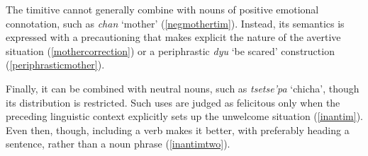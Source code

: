 \documentclass[output=paper,colorlinks,citecolor=brown]{langscibook}
\begin{document}
    \z
\z  

The timitive cannot generally combine with nouns of positive emotional connotation, such as \emph{chan} `mother' (\ref{negmothertim}). Instead, its semantics is expressed with a precautioning  that makes explicit the nature of the avertive situation (\ref{mothercorrection}) or a periphrastic \emph{dyu} `be scared' construction (\ref{periphrasticmother}).

    
    \z

    \begin{exe}
\end{exe}


Finally, it can be combined with neutral nouns, such as \emph{tsetse'pa} `chicha', though its distribution is restricted. Such uses are judged as felicitous only when the preceding linguistic context explicitly sets up the unwelcome situation (\ref{inantim}). Even then, though, including a verb makes it better, with  preferably heading a sentence, rather than a noun phrase (\ref{inantimtwo}).
\end{document}
